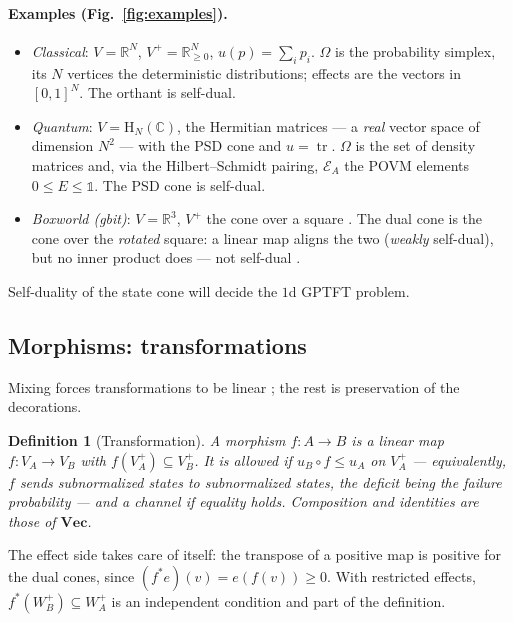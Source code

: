 \documentclass[prl,aps,10pt,superscriptaddress, floatfix]{revtex4-2}
\newtheorem*{defi}{Definition}
\begin{document}
\paragraph{Examples (Fig.~\ref{fig:examples}).}
\begin{itemize}
\item \emph{Classical}: $V=\mathbb{R}^N$, $V^+=\mathbb{R}^N_{\ge0}$, $u(p)=\sum_ip_i$. $\Omega$ is the probability simplex, its $N$ vertices the deterministic distributions; effects are the vectors in $[0,1]^N$. The orthant is self-dual.
\item \emph{Quantum}: $V=\mathrm{H}_N(\mathbb{C})$, the Hermitian matrices --- a \emph{real} vector space of dimension $N^2$ --- with the PSD cone and $u=\operatorname{tr}$. $\Omega$ is the set of density matrices and, via the Hilbert--Schmidt pairing, $\mathcal E_A$ the POVM elements $0\le E\le\mathds{1}$. The PSD cone is self-dual.
\item \emph{Boxworld (gbit)}: $V=\mathbb{R}^3$, $V^+$ the cone over a square \cite{Barrett2007}. The dual cone is the cone over the \emph{rotated} square: a linear map aligns the two (\emph{weakly} self-dual), but no inner product does --- not self-dual \cite{Mueller2021,BarnumWilce2016}.
\end{itemize}
Self-duality of the state cone will decide the $1$d GPTFT problem.

\subsection{Morphisms: transformations}

Mixing forces transformations to be linear \cite{Mueller2021}; the rest is preservation of the decorations.

\begin{defi}[Transformation]
A \emph{morphism} $f:A\to B$ is a linear map $f:V_A\to V_B$ with $f(V_A^+)\subseteq V_B^+$. It is \emph{allowed} if $u_B\circ f\le u_A$ on $V_A^+$ --- equivalently, $f$ sends subnormalized states to subnormalized states, the deficit being the failure probability --- and a \emph{channel} if equality holds. Composition and identities are those of $\mathbf{Vec}$.
\end{defi}

The effect side takes care of itself: the transpose of a positive map is positive for the dual cones, since $(f^*e)(v)=e(f(v))\ge0$. With restricted effects, $f^*(W_B^+)\subseteq W_A^+$ is an independent condition and part of the definition.
\end{document}
